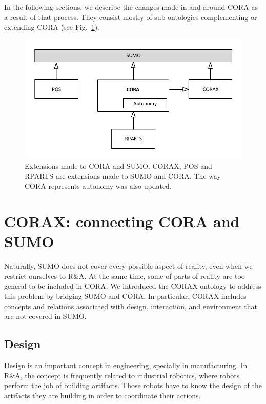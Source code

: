 \documentclass[preprint,12pt]{elsarticle}
\newcommand{\hlc}[2][yellow]{ {\sethlcolor{#1} \hl{#2}} }
\newcommand{\joel}[1]{{\hlc[green]{\textbf{Joel}: #1}}}
\begin{document}
In the following sections, we describe the changes made in and around CORA as a result of that process. They consist mostly of sub-ontologies complementing or extending CORA (see Fig.~\ref{fig:modules}).

\begin{figure}[th] 
	\centering  
	\includegraphics[]{figs/modules}  
	\caption{Extensions made to CORA and SUMO. CORAX, POS and RPARTS are extensions made to SUMO and CORA. The way CORA represents autonomy was also updated.}  
	\label{fig:modules}  
\end{figure} 


\section{CORAX: connecting CORA and SUMO}

Naturally, SUMO does not cover every possible aspect of reality, even when we restrict ourselves to R\&A. At the same time, some of parts of reality are too general to be included in CORA. We introduced the CORAX ontology to address this problem by bridging SUMO and CORA. In particular, CORAX includes concepts and relations associated with design, interaction, and environment that are not covered in SUMO.

\subsection{Design}

Design is an important concept in engineering, specially in manufacturing. In R\&A, the concept is frequently related to industrial robotics, where robots perform the job of building artifacts. Those robots have to know the design of the artifacts they are building in order to coordinate their actions. 
\end{document}
